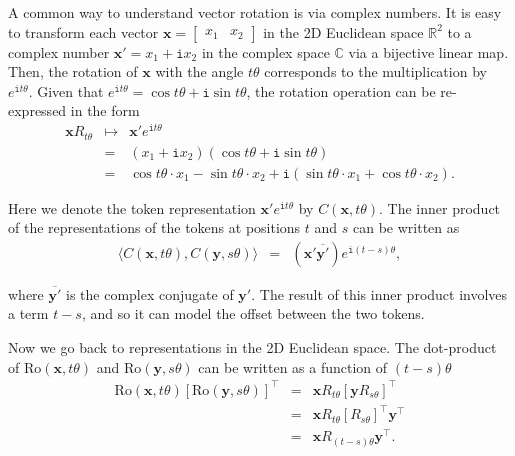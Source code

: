 A common way to understand vector rotation is via complex numbers. It is easy to transform each vector $\mathbf{x} = \begin{bmatrix} x_1 & x_2 \end{bmatrix}$ in the 2D Euclidean space $\mathbb{R}^2$ to a complex number $\mathbf{x}' = x_1 + \mathtt{i} x_2$ in the complex space $\mathbb{C}$ via a bijective linear map. Then, the rotation of $\mathbf{x}$ with the angle $t\theta$ corresponds to the multiplication by $e^{\mathtt{i} t\theta}$. Given that $e^{\mathtt{i} t\theta} = \cos t \theta + \mathtt{i} \sin t \theta$, the rotation operation can be re-expressed in the form
\begin{eqnarray}
\mathbf{x} R_{t \theta} & \mapsto & \mathbf{x}' e^{\mathtt{i} t\theta} \nonumber \\
                        & =       & (x_1 + \mathtt{i} x_2) (\cos t \theta + \mathtt{i} \sin t \theta) \nonumber \\
                        & =       & \cos t \theta \cdot x_1 - \sin t \theta \cdot x_2 + \mathtt{i} (\sin t \theta \cdot x_1 + \cos t \theta \cdot x_2).
\end{eqnarray}

\noindent Here we denote the token representation $\mathbf{x}' e^{\mathtt{i} t\theta}$ by $C(\mathbf{x},t\theta)$. The inner product of the representations of the tokens at positions $t$ and $s$ can be written as
\begin{eqnarray}
\langle C(\mathbf{x},t\theta), C(\mathbf{y},s \theta) \rangle & = & (\mathbf{x}' \overline{\mathbf{y}'}) e^{\mathtt{i} (t - s) \theta} \label{eq:rope-inner-product},
\end{eqnarray}

\noindent where $\overline{\mathbf{y}'}$ is the complex conjugate of $\mathbf{y}'$. The result of this inner product involves a term $t - s$, and so it can model the offset between the two tokens.

Now we go back to representations in the 2D Euclidean space. The dot-product of $\mathrm{Ro}(\mathbf{x},t\theta)$ and $\mathrm{Ro}(\mathbf{y},s\theta)$ can be written as a function of $(t - s)\theta$
\begin{eqnarray}
\mathrm{Ro}(\mathbf{x},t\theta) [\mathrm{Ro}(\mathbf{y},s\theta)]^\top & = & \mathbf{x} R_{t \theta} [\mathbf{y} R_{s \theta}]^\top \nonumber \\
                                                                               & = & \mathbf{x} R_{t \theta} [R_{s \theta}]^\top \mathbf{y}^\top \nonumber \\
                                                                               & = & \mathbf{x} R_{(t - s) \theta} \mathbf{y}^\top.
\end{eqnarray}

